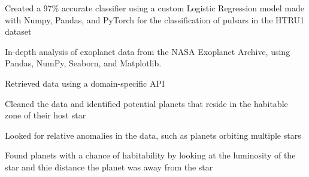 \documentclass[]{resume-template}
\begin{document}
\begin{minipage}[t]{0.66\textwidth}
    \label{subsec:pulsar-identification}
    \begin{tightemize}
        \item Created a 97\% accurate classifier using a custom Logistic Regression model made with Numpy, Pandas, and PyTorch for the classification of pulsars in the HTRU1 dataset
    \end{tightemize}

    \label{subsec:exo-eda}
    \begin{tightemize}
        \item In-depth analysis of exoplanet data from the NASA Exoplanet Archive, using Pandas, NumPy,
        Seaborn, and Matplotlib.
        \item Retrieved data using a domain-specific API
        \item Cleaned the data and identified potential planets that reside in the habitable zone of their host star
        \item Looked for relative anomalies in the data, such as planets orbiting multiple stars
        \item Found planets with a chance of habitability by looking at the luminosity of the star and thie distance the planet was away from the star

    \end{tightemize}
    \vspace{\topsep}


\end{minipage}
\end{document}
